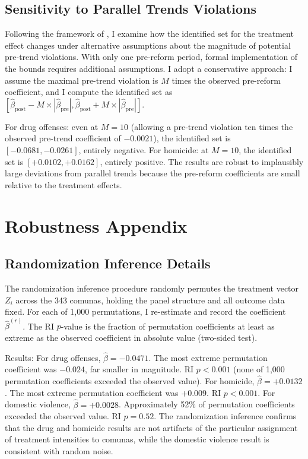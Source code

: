 \documentclass[12pt]{article}
\begin{document}
\subsection{Sensitivity to Parallel Trends Violations}

Following the framework of \citet{Rambachan2023}, I examine how the identified set for the treatment effect changes under alternative assumptions about the magnitude of potential pre-trend violations. With only one pre-reform period, formal implementation of the \citet{Rambachan2023} bounds requires additional assumptions. I adopt a conservative approach: I assume the maximal pre-trend violation is $M$ times the observed pre-reform coefficient, and I compute the identified set as $[\hat{\beta}_{\text{post}} - M \times |\hat{\beta}_{\text{pre}}|, \hat{\beta}_{\text{post}} + M \times |\hat{\beta}_{\text{pre}}|]$.

For drug offenses: even at $M = 10$ (allowing a pre-trend violation ten times the observed pre-trend coefficient of $-0.0021$), the identified set is $[-0.0681, -0.0261]$, entirely negative. For homicide: at $M = 10$, the identified set is $[+0.0102, +0.0162]$, entirely positive. The results are robust to implausibly large deviations from parallel trends because the pre-reform coefficients are small relative to the treatment effects.


\setcounter{table}{0}
\setcounter{figure}{0}
\section{Robustness Appendix}\label{app:robustness}

\subsection{Randomization Inference Details}

The randomization inference procedure randomly permutes the treatment vector $Z_i$ across the 343 comunas, holding the panel structure and all outcome data fixed. For each of 1,000 permutations, I re-estimate  and record the coefficient $\hat{\beta}^{(r)}$. The RI $p$-value is the fraction of permutation coefficients at least as extreme as the observed coefficient in absolute value (two-sided test).

Results: For drug offenses, $\hat{\beta} = -0.0471$. The most extreme permutation coefficient was $-0.024$, far smaller in magnitude. RI $p < 0.001$ (none of 1,000 permutation coefficients exceeded the observed value). For homicide, $\hat{\beta} = +0.0132$. The most extreme permutation coefficient was $+0.009$. RI $p < 0.001$. For domestic violence, $\hat{\beta} = +0.0028$. Approximately 52\% of permutation coefficients exceeded the observed value. RI $p = 0.52$. The randomization inference confirms that the drug and homicide results are not artifacts of the particular assignment of treatment intensities to comunas, while the domestic violence result is consistent with random noise.
\end{document}
